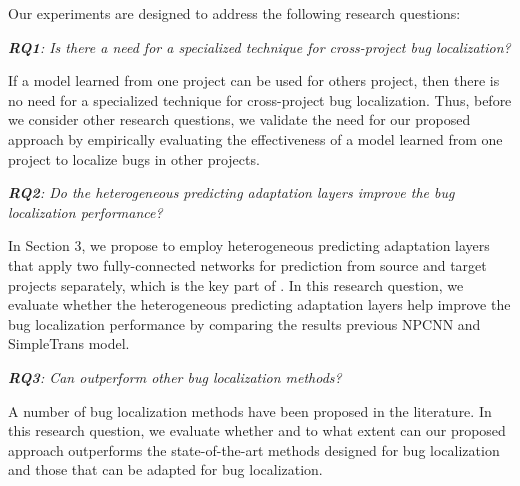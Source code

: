 
Our experiments are designed to address the following research questions:

\vspace{0.2cm}\noindent\textit{\textbf{RQ1}: Is there a need for a specialized technique for cross-project bug localization?}

If a model learned from one project can be used for others project, then there is no need for a specialized technique for cross-project bug localization. Thus, before we consider other research questions, we validate the need for our proposed approach by empirically evaluating the effectiveness of a model learned from one project to localize bugs in other projects.

\vspace{0.2cm}\noindent\textit{\textbf{RQ2}: Do the heterogeneous predicting adaptation layers improve the bug localization performance?}


In Section 3, we propose to employ heterogeneous predicting adaptation layers that apply two fully-connected networks for prediction from source and target projects separately, which is the key part of \TRANPCNN. In this research question, we evaluate whether the heterogeneous predicting adaptation layers help improve the bug localization performance by comparing the results previous NPCNN and SimpleTrans model. 

\vspace{0.2cm}\noindent\textit{\textbf{RQ3}: Can \TRANPCNN outperform other bug localization methods?}

A number of bug localization methods have been proposed in the literature. In this research question, we evaluate whether and to what extent can our proposed approach \TRANPCNN outperforms the state-of-the-art methods designed for bug localization and those that can be adapted for bug localization. 